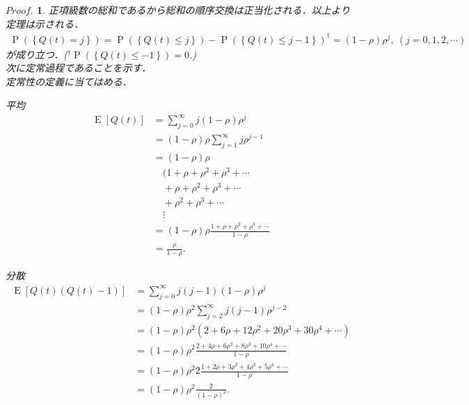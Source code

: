\documentclass[a4j,papersize,disablejfam,slide,14pt]{jsarticle}
\newtheorem{Proof}{$Proof.$}
\def\Exp#1{\operatorname{E} \left[ #1 \right]} %
\def\prob#1{\operatorname{P} \left(\left\{ #1 \right\}\right)} %
\begin{document}
\begin{Proof}
        正項級数の総和であるから総和の順序交換は正当化される．以上より定理は示される．
        \begin{align}
        	\prob{Q(t)=j} = \prob{Q(t) \leq j} - \prob{Q(t) \leq j-1}^\dagger = (1-\rho)\rho^j,\ (j=0,1,2,\cdots)
        \end{align}
        が成り立つ．{\scriptsize ($^\dagger \prob{Q(t) \leq -1} = 0$.)} \\
        次に定常過程であることを示す．\\
    	定常性の定義に当てはめる．
        \begin{desciption}
        	\item[平均]\mbox{}\\
            	\begin{align}
            		\Exp{Q(t)} &= \sum_{j=0}^{\infty} j(1-\rho)\rho^j \\
                	&= (1-\rho) \rho \sum_{j=1}^{\infty} j \rho^{j-1} \\
                	&= (1-\rho) \rho \\
                	&\quad(1 + \rho + \rho^2 + \rho^3 + \cdots \\
                	&\quad+ \rho + \rho^2 + \rho^3 + \cdots \\
                	&\quad+ \rho^2 + \rho^3 + \cdots \\
                	&\quad\vdots \\
                	&= (1-\rho) \rho \frac{1 + \rho + \rho^2 + \rho^3 + \cdots}{1-\rho} \\
                	&= \frac{\rho}{1-\rho}.
            	\end{align}
            \item[分散]\mbox{}\\
            	\begin{align}
            		\Exp{Q(t)(Q(t)-1)} &= \sum_{j=0}^{\infty} j(j-1) (1-\rho)\rho^j \\
                	&= (1-\rho) \rho^2 \sum_{j=2}^{\infty} j(j-1) \rho^{j-2} \\
                    &= (1-\rho) \rho^2 (2 + 6\rho + 12\rho^2 + 20\rho^3 + 30\rho^4 + \cdots)\\
                	&= (1-\rho) \rho^2 \frac{2 + 4\rho + 6\rho^2 + 8\rho^3 + 10\rho^4 + \cdots}{1-\rho} \\
                    &= (1-\rho) \rho^2 2 \frac{1 + 2\rho + 3\rho^2 + 4\rho^3 + 5\rho^4 + \cdots}{1-\rho} \\
                    &= (1-\rho) \rho^2 \frac{2}{(1-\rho)^3}.
            	\end{align}

\end{desciption}
\end{Proof}
\end{document}
